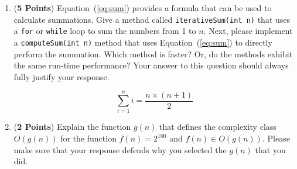 \documentclass[12pt]{article}
\begin{document}
\begin{enumerate}
\begin{enumerate}
    \item ({\bf 5 Points}) Equation~(\ref{eq:sum}) provides a formula that can be used to calculate summations.  Give a
      method called {\tt iterativeSum(int n)} that uses a {\tt for} or {\tt while} loop to sum the numbers from 1 to
      $n$.  Next, please implement a {\tt computeSum(int n)} method that uses Equation~(\ref{eq:sum}) to directly
      perform the summation.  Which method is faster?  Or, do the methods exhibit the same run-time performance?
      Your answer to this question should always fully justify your response.

      \begin{equation}
        \sum_{i=1}^{n}i = \frac{n \times (n+1)}{2}
        \label{eq:sum}
      \end{equation}

    \item ({\bf 2 Points}) Explain the function $g(n)$ that defines the complexity class $O(g(n))$ for the function
      $f(n) = 2^{100}$ and $f(n) \in O(g(n))$.  Please make sure that your response defends why you selected the $g(n)$
      that you did.










\end{enumerate}



\end{enumerate}
\end{document}
